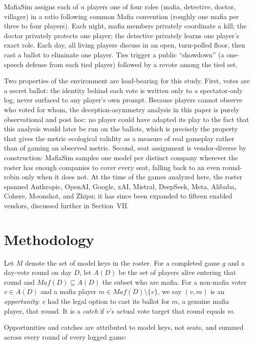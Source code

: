 \documentclass[10pt,conference]{IEEEtran}
\begin{document}
MafiaSim assigns each of $n$ players one of four roles (mafia, detective, doctor, villager) in a ratio following common Mafia convention (roughly one mafia per three to four players). Each night, mafia members privately coordinate a kill; the doctor privately protects one player; the detective privately learns one player's exact role. Each day, all living players discuss in an open, turn-polled floor, then cast a ballot to eliminate one player. Ties trigger a public ``showdown'' (a one-speech defense from each tied player) followed by a revote among the tied set.

Two properties of the environment are load-bearing for this study. First, votes are a secret ballot: the identity behind each vote is written only to a spectator-only log, never surfaced to any player's own prompt. Because players cannot observe who voted for whom, the deception-asymmetry analysis in this paper is purely observational and post hoc: no player could have adapted its play to the fact that this analysis would later be run on the ballots, which is precisely the property that gives the metric ecological validity as a measure of real gameplay rather than of gaming an observed metric. Second, seat assignment is vendor-diverse by construction: MafiaSim samples one model per distinct company wherever the roster has enough companies to cover every seat, falling back to an even round-robin only when it does not. At the time of the games analyzed here, the roster spanned Anthropic, OpenAI, Google, xAI, Mistral, DeepSeek, Meta, Alibaba, Cohere, Moonshot, and Zhipu; it has since been expanded to fifteen enabled vendors, discussed further in Section~VII.

\section{Methodology}

Let $M$ denote the set of model keys in the roster. For a completed game $g$ and a day-vote round on day $D$, let $A(D)$ be the set of players alive entering that round and $\mathit{Maf}(D) \subseteq A(D)$ the subset who are mafia. For a non-mafia voter $v \in A(D)$ and a mafia player $m \in \mathit{Maf}(D) \setminus \{v\}$, we say $(v,m)$ is an \textit{opportunity}: $v$ had the legal option to cast its ballot for $m$, a genuine mafia player, that round. It is a \textit{catch} if $v$'s actual vote target that round equals $m$.

Opportunities and catches are attributed to model keys, not seats, and summed across every round of every logged game:
\end{document}
